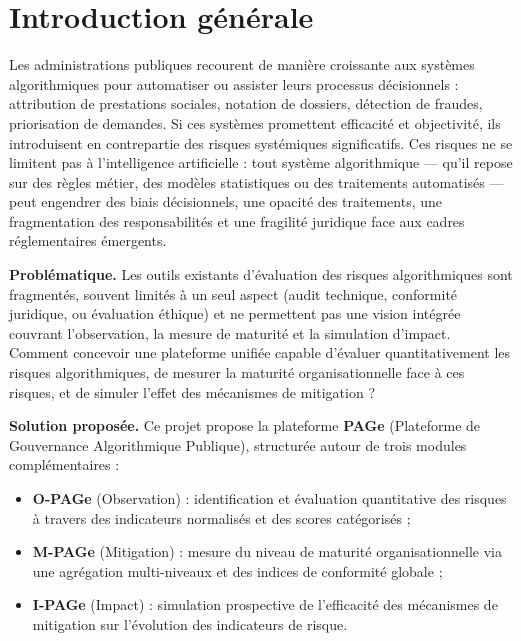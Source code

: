 \chapter*{Introduction générale}

Les administrations publiques recourent de manière croissante aux systèmes algorithmiques pour automatiser ou assister leurs processus décisionnels : attribution de prestations sociales, notation de dossiers, détection de fraudes, priorisation de demandes. Si ces systèmes promettent efficacité et objectivité, ils introduisent en contrepartie des risques systémiques significatifs. Ces risques ne se limitent pas à l'intelligence artificielle : tout système algorithmique — qu'il repose sur des règles métier, des modèles statistiques ou des traitements automatisés — peut engendrer des biais décisionnels, une opacité des traitements, une fragmentation des responsabilités et une fragilité juridique face aux cadres réglementaires émergents.

\vspace{0.3cm}
\noindent\textbf{Problématique.} Les outils existants d'évaluation des risques algorithmiques sont fragmentés, souvent limités à un seul aspect (audit technique, conformité juridique, ou évaluation éthique) et ne permettent pas une vision intégrée couvrant l'observation, la mesure de maturité et la simulation d'impact. Comment concevoir une plateforme unifiée capable d'évaluer quantitativement les risques algorithmiques, de mesurer la maturité organisationnelle face à ces risques, et de simuler l'effet des mécanismes de mitigation ?

\vspace{0.3cm}
\noindent\textbf{Solution proposée.} Ce projet propose la plateforme \textbf{PAGe} (Plateforme de Gouvernance Algorithmique Publique), structurée autour de trois modules complémentaires :
\begin{itemize}
    \item \textbf{O-PAGe} (Observation) : identification et évaluation quantitative des risques à travers des indicateurs normalisés et des scores catégorisés ;
    \item \textbf{M-PAGe} (Mitigation) : mesure du niveau de maturité organisationnelle via une agrégation multi-niveaux et des indices de conformité globale ;
    \item \textbf{I-PAGe} (Impact) : simulation prospective de l'efficacité des mécanismes de mitigation sur l'évolution des indicateurs de risque.
\end{itemize}

